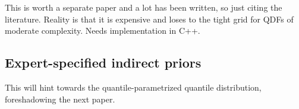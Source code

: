 \documentclass[
  12pt,
]{article}
\begin{document}
This is worth a separate paper and a lot has been written, so just citing the literature. Reality is that it is expensive and loses to the tight grid for QDFs of moderate complexity. Needs implementation in C++.

\hypertarget{expert-specified-indirect-priors}{%
\subsection{Expert-specified indirect priors}\label{expert-specified-indirect-priors}}

This will hint towards the quantile-parametrized quantile distribution, foreshadowing the next paper.

  
\end{document}
